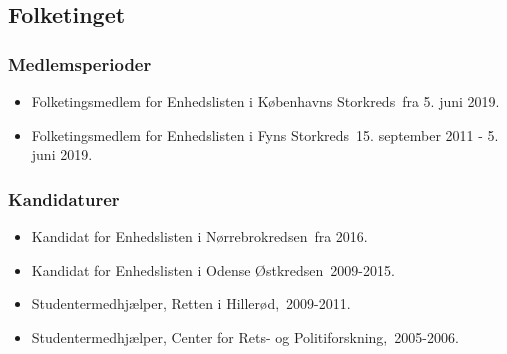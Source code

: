 \documentclass[11pt, a4paper]{awesome-cv}
\begin{document}
\begin{cvletter}
\subsection*{Folketinget}
\subsubsection*{Medlemsperioder}
\begin{itemize}
\item Folketingsmedlem for Enhedslisten i Københavns Storkreds fra 5. juni 2019.
\item Folketingsmedlem for Enhedslisten i Fyns Storkreds 15. september 2011 - 5. juni 2019.
\end{itemize}
\subsubsection*{Kandidaturer}
\begin{itemize}
\item Kandidat for Enhedslisten i Nørrebrokredsen fra 2016.
\item Kandidat for Enhedslisten i Odense Østkredsen 2009-2015.
\end{itemize}
\begin{itemize}
\item Studentermedhjælper, Retten i Hillerød, 2009-2011.
\item Studentermedhjælper, Center for Rets- og Politiforskning, 2005-2006.
\end{itemize}
\end{cvletter}
\end{document}
